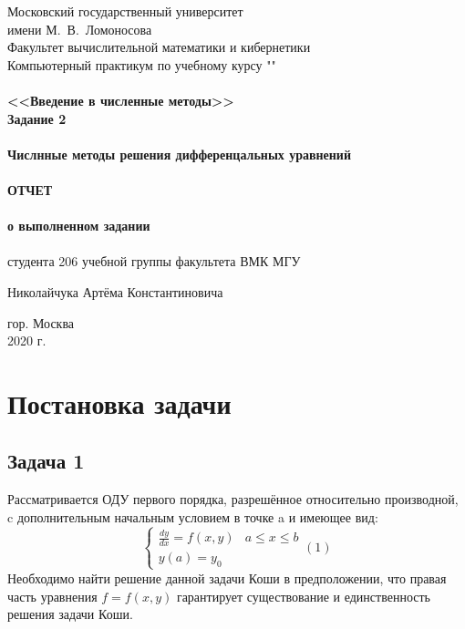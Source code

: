 \documentclass[a4paper,12pt,titlepage,finall]{article}
\begin{document}
\begin{titlepage}
    \begin{center}
	{\small \sc Московский государственный университет \\имени М.~В.~Ломоносова\\
	Факультет вычислительной математики и кибернетики\\}
	\vfill
	{\Large \sc Компьютерный практикум по учебному курсу ""}\\
	~\\
	{\large \bf <<Введение в численные методы>> \\
	Задание 2}\\
	~\\
	{\small \bf  Числнные методы решения дифференцальных уравнений\\ }
	~\\
	{\large \bf  ОТЧЕТ \\ }
	~\\
	{\small \bf  о выполненном задании \\ }
	~\\
	{\small \sc студента 206 учебной группы факультета ВМК МГУ\\}

	{\small \sc Николайчука Артёма Константиновича\\}
	\vfill
    \end{center}

    \begin{center}
	\vfill
	{\small гор. Москва\\2020 г.}
    \end{center}
\end{titlepage}

\tableofcontents

\newpage

\section{Постановка задачи}

\subsection{Задача 1}
Рассматривается ОДУ первого порядка, разрешённое относительно производной, c дополнительным начальным условием в точке a и имеющее вид:
	\begin{equation*}
	\begin{cases}
	 \frac{dy}{dx} = f(x, y) &  a \leq x \leq b  \\
	 y(a) = y_{0}
	\end{cases}
	(1)
	\end{equation*}
Необходимо найти решение данной задачи Коши в предположении, что правая часть уравнения $f = f(x, y)$ гарантирует существование и единственность решения задачи Коши.\\
\end{document}
